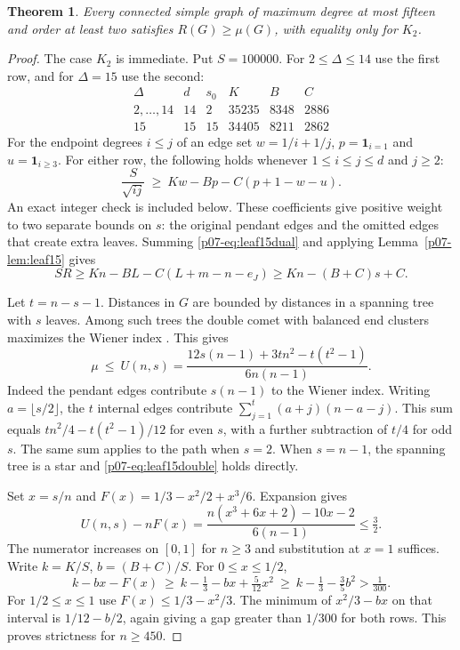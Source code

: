 \documentclass[11pt,a4paper]{article}
\newtheorem{theorem}{Theorem}[section]
\begin{document}
\begin{theorem}\label{p07-thm:leaf15}
Every connected simple graph of maximum degree at most fifteen and order
at least two satisfies $R(G)\ge\mu(G)$, with equality only for $K_2$.
\end{theorem}
\begin{proof}
The case $K_2$ is immediate. Put $S=100000$. For $2\le\Delta\le14$
use the first row, and for $\Delta=15$ use the second:
\[
\begin{array}{c|rrrrr}
\Delta&d&s_0&K&B&C\\ \hline
2,\ldots,14&14&2&35235&8348&2886\\
15&15&15&34405&8211&2862
\end{array}
\]
For the endpoint degrees $i\le j$ of an edge set $w=1/i+1/j$,
$p=\mathbf{1}_{i=1}$ and $u=\mathbf{1}_{i\ge3}$.
For either row, the following holds whenever $1\le i\le j\le d$ and
$j\ge2$:
\begin{equation}\label{p07-eq:leaf15dual}
 \frac{S}{\sqrt{ij}}\ \ge\ K w-Bp-C(p+1-w-u).
\end{equation}
An exact integer check is included below. These coefficients give
positive weight to two separate bounds on $s$: the original pendant
edges and the omitted edges that create extra leaves. Summing
\eqref{p07-eq:leaf15dual} and applying Lemma~\ref{p07-lem:leaf15} gives
\[
  S R\ge Kn-BL-C(L+m-n-e_J)\ge Kn-(B+C)s+C.
\]

Let $t=n-s-1$. Distances in $G$ are bounded by distances in a
spanning tree with $s$ leaves. Among such trees the double comet with
balanced end clusters maximizes the Wiener index
\cite[Lemma~2.4 and the observation following it]{p07-CPSMean}. This gives
\begin{equation}\label{p07-eq:leaf15double}
 \mu\ \le\ U(n,s)=\frac{12s(n-1)+3tn^2-t(t^2-1)}{6n(n-1)}.
\end{equation}
Indeed the pendant edges contribute $s(n-1)$ to the Wiener index.
Writing $a=\lfloor s/2\rfloor$, the $t$ internal edges contribute
$\sum_{j=1}^t(a+j)(n-a-j)$. This sum equals
$tn^2/4-t(t^2-1)/12$ for even $s$, with a further subtraction of
$t/4$ for odd $s$. The same sum applies to the path when $s=2$. When $s=n-1$, the spanning tree is a star and
\eqref{p07-eq:leaf15double} holds directly.

Set $x=s/n$ and $F(x)=1/3-x^2/2+x^3/6$. Expansion gives
\[
 U(n,s)-nF(x)
 =\frac{n(x^3+6x+2)-10x-2}{6(n-1)}\le\tfrac32 .
\]
The numerator increases on $[0,1]$ for $n\ge3$ and substitution at
$x=1$ suffices. Write $k=K/S$, $b=(B+C)/S$. For $0\le x\le1/2$,
\[
  k-bx-F(x)\ \ge\ k-\tfrac13-bx+\tfrac5{12}x^2
        \ \ge\ k-\tfrac13-\tfrac35 b^2>\tfrac1{300}.
\]
For $1/2\le x\le1$ use $F(x)\le1/3-x^2/3$. The minimum of
$x^2/3-bx$ on that interval is $1/12-b/2$, again giving a gap
greater than $1/300$ for both rows. This proves strictness for
$n\ge450$.



\end{proof}
\end{document}
